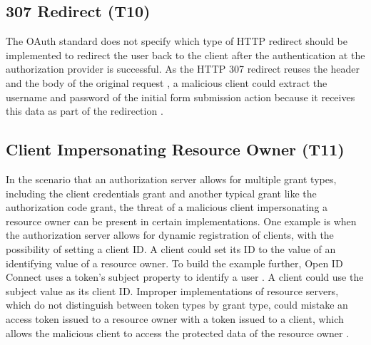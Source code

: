 \documentclass[
    fontsize=12pt,
    headings=small,
    parskip=half,           %
    bibliography=totoc,
    numbers=noenddot,       %
    open=any,               %
    ]{scrreprt}
\begin{document}
\subsection[307 Redirect]{307 Redirect (T10)}
\label{threat:T10}
The OAuth standard does not specify which type of HTTP redirect should be implemented to redirect the user back to the client after the authentication at the authorization provider is successful. As the HTTP 307 redirect reuses the header and the body of the original request \cite{fielding1999rfc2616}, a malicious client could extract the username and password of the initial form submission action because it receives this data as part of the redirection \cite{fett2016comprehensive}.

\subsection[Client Impersonating Resource Owner]{Client Impersonating Resource Owner (T11)}
\label{threat:T11}
In the scenario that an authorization server allows for multiple grant types, including the client credentials grant and another typical grant like the authorization code grant, the threat of a malicious client impersonating a resource owner can be present in certain implementations. One example is when the authorization server allows for dynamic registration of clients, with the possibility of setting a client ID. A client could set its ID to the value of an identifying value of a resource owner. To build the example further, Open ID Connect uses a token's subject property to identify a user \cite{sakimura2014openid}. A client could use the subject value as its client ID. Improper implementations of resource servers, which do not distinguish between token types by grant type, could mistake an access token issued to a resource owner with a token issued to a client, which allows the malicious client to access the protected data of the resource owner \cite{lodderstedt2020oauth}.
\end{document}
